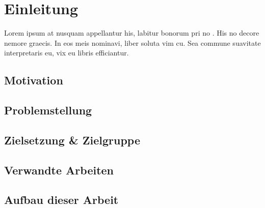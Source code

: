 \chapter{Einleitung}
\label{ch:intro}
Lorem ipsum at nusquam appellantur his, labitur bonorum pri no \citep{dueck:trio}. His no decore nemore graecis. In eos meis nominavi, liber soluta vim cu. Sea commune suavitate interpretaris eu, vix eu libris efficiantur.

%
%
\section{Motivation}
\label{sec:intro:motivation}
\lipsum[1-1]

%
%
\section{Problemstellung}
\label{sec:intro:problem}
\lipsum[1-1]

%
%
\section{Zielsetzung \& Zielgruppe}
\label{sec:intro:goal}
\lipsum[1-1]

%
%
\section{Verwandte Arbeiten}
\label{sec:intro:related}
\lipsum[1-1]

%
%
\section{Aufbau dieser Arbeit}
\label{sec:intro:structure}
\lipsum[1-1]
